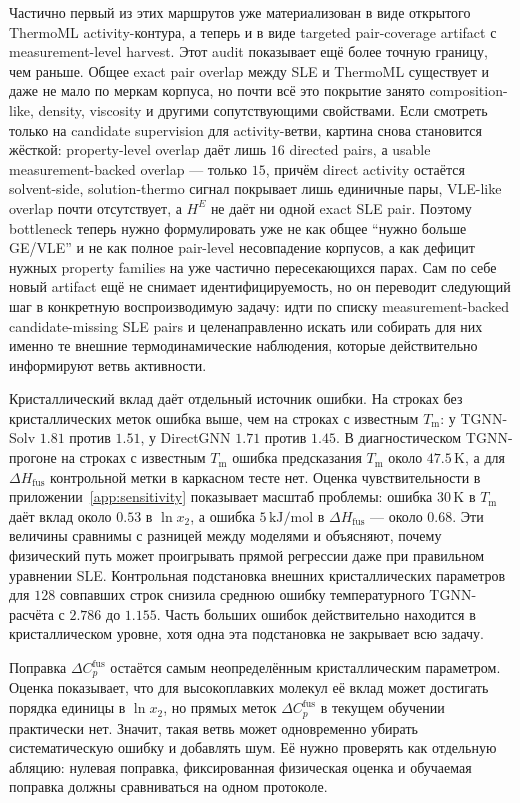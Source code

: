 \documentclass[11pt]{article}
\newcommand{\Tm}{T_{\mathrm m}}
\newcommand{\dHfus}{\Delta H_{\mathrm{fus}}}
\theoremstyle{definition}
\begin{document}
Частично первый из этих маршрутов уже материализован в виде открытого ThermoML activity-контура, а теперь и в виде targeted pair-coverage artifact с measurement-level harvest. Этот audit показывает ещё более точную границу, чем раньше. Общее exact pair overlap между SLE и ThermoML существует и даже не мало по меркам корпуса, но почти всё это покрытие занято composition-like, density, viscosity и другими сопутствующими свойствами. Если смотреть только на candidate supervision для activity-ветви, картина снова становится жёсткой: property-level overlap даёт лишь $16$ directed pairs, а usable measurement-backed overlap --- только $15$, причём direct activity остаётся solvent-side, solution-thermo сигнал покрывает лишь единичные пары, VLE-like overlap почти отсутствует, а \(H^E\) не даёт ни одной exact SLE pair. Поэтому bottleneck теперь нужно формулировать уже не как общее ``нужно больше GE/VLE'' и не как полное pair-level несовпадение корпусов, а как дефицит нужных property families на уже частично пересекающихся парах. Сам по себе новый artifact ещё не снимает идентифицируемость, но он переводит следующий шаг в конкретную воспроизводимую задачу: идти по списку measurement-backed candidate-missing SLE pairs и целенаправленно искать или собирать для них именно те внешние термодинамические наблюдения, которые действительно информируют ветвь активности.

Кристаллический вклад даёт отдельный источник ошибки. На строках без кристаллических меток ошибка выше, чем на строках с известным $\Tm$: у TGNN-Solv $1.81$ против $1.51$, у DirectGNN $1.71$ против $1.45$. В диагностическом TGNN-прогоне на строках с известным $\Tm$ ошибка предсказания $\Tm$ около $47.5\,\mathrm K$, а для $\dHfus$ контрольной метки в каркасном тесте нет. Оценка чувствительности в приложении~\ref{app:sensitivity} показывает масштаб проблемы: ошибка $30\,\mathrm K$ в $\Tm$ даёт вклад около $0.53$ в $\ln x_2$, а ошибка $5\,\mathrm{kJ/mol}$ в $\dHfus$ --- около $0.68$. Эти величины сравнимы с разницей между моделями и объясняют, почему физический путь может проигрывать прямой регрессии даже при правильном уравнении SLE. Контрольная подстановка внешних кристаллических параметров для $128$ совпавших строк снизила среднюю ошибку температурного TGNN-расчёта с $2.786$ до $1.155$. Часть больших ошибок действительно находится в кристаллическом уровне, хотя одна эта подстановка не закрывает всю задачу.

Поправка $\Delta C_p^{\mathrm{fus}}$ остаётся самым неопределённым кристаллическим параметром. Оценка показывает, что для высокоплавких молекул её вклад может достигать порядка единицы в $\ln x_2$, но прямых меток $\Delta C_p^{\mathrm{fus}}$ в текущем обучении практически нет. Значит, такая ветвь может одновременно убирать систематическую ошибку и добавлять шум. Её нужно проверять как отдельную абляцию: нулевая поправка, фиксированная физическая оценка и обучаемая поправка должны сравниваться на одном протоколе.
\end{document}
